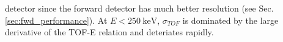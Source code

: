 \documentclass[number,5p]{elsarticle}
\begin{document}
detector since the forward detector has much better resolution (see Sec. \ref{sec:fwd_performance}).
At $E < \SI{250}{\keV}$, $\sigma_{TOF}$ is dominated by the large derivative
of the TOF-E relation and deteriates rapidly.
\end{document}
